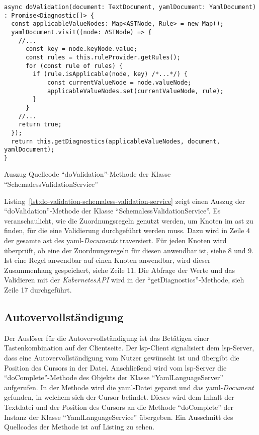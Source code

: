 \begin{listing}[htp]
  \begin{verbatim}
async doValidation(document: TextDocument, yamlDocument: YamlDocument)
: Promise<Diagnostic[]> {
  const applicableValueNodes: Map<ASTNode, Rule> = new Map();
  yamlDocument.visit((node: ASTNode) => {
    //...
      const key = node.keyNode.value;
      const rules = this.ruleProvider.getRules();
      for (const rule of rules) {
        if (rule.isApplicable(node, key) /*...*/) {
            const currentValueNode = node.valueNode;
            applicableValueNodes.set(currentValueNode, rule);
        }
      }
    //...
    return true;
  });
  return this.getDiagnostics(applicableValueNodes, document, yamlDocument);
}
      \end{verbatim}
  \caption{Auszug Quellcode ``doValidation''-Methode der Klasse ``SchemalessValidationService''}
  \label{lst:do-validation-schemaless-validation-service}
\end{listing}

Listing~\ref{lst:do-validation-schemaless-validation-service} zeigt einen Auszug der ``doValidation''-Methode der Klasse ``SchemalessValidationService''.
Es veranschaulicht, wie die Zuordnungsregeln genutzt werden, um Knoten im \ac{ast} zu finden, für die eine Validierung durchgeführt
werden muss. Dazu wird in Zeile 4 der gesamte \ac{ast} des \ac{yaml}-\textit{Documents} traversiert. Für
jeden Knoten wird überprüft, ob eine der Zuordnungsregeln für diesen anwendbar ist, siehe 8 und 9.
Ist eine Regel anwendbar auf einen Knoten anwendbar, wird dieser Zusammenhang gespeichert, siehe Zeile 11. Die Abfrage der Werte und
das Validieren mit der \textit{KubernetesAPI} wird in der ``getDiagnostics''-Methode, sieh Zeile 17 durchgeführt.

\subsection{Autovervollständigung}

Der Auslöser für die Autovervollständigung ist das Betätigen einer Tastenkombination auf der Clientseite. Der \ac{lsp}-Client signalisiert dem \ac{lsp}-Server,
dass eine Autovervollständigung vom Nutzer gewünscht ist und übergibt die Position des Cursors in der Datei.
Anschließend wird vom \ac{lsp}-Server die ``doComplete''-Methode des Objekts der Klasse ``YamlLanguageServer'' aufgerufen.
In der Methode wird die \ac{yaml}-Datei geparst und das \ac{yaml}-\textit{Document} gefunden, in welchem sich der Cursor befindet.
Dieses wird dem Inhalt der Textdatei und der Position des Cursors an die Methode ``doComplete'' der Instanz der Klasse ``YamlLanguageService'' übergeben.
Ein Ausschnitt des Quellcodes der Methode ist auf Listing zu sehen.

